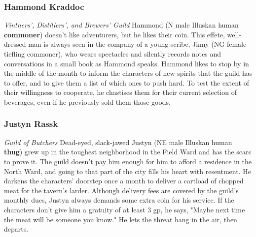 \documentclass[10pt,a4paper,twoside,twocolumn,openany,nodeprecatedcode]{dndbook}
\begin{document}
\subsubsection{Hammond Kraddoc}
\textit{Vintners', Distillers', and Brewers' Guild}
Hammond (N male Illuskan human \textbf{commoner}) doesn't like adventurers, but he likes their coin. This effete, well-dressed man is always seen in the company of a young scribe, Jinny (NG female tiefling commoner), who wears spectacles and silently records notes and conversations in a small book as Hammond speaks.
Hammond likes to stop by in the middle of the month to inform the characters of new spirits that the guild has to offer, and to give them a list of which ones to push hard. To test the extent of their willingness to cooperate, he chastises them for their current selection of beverages, even if he previously sold them those goods.
\subsubsection{Justyn Rassk}
\textit{Guild of Butchers}
Dead-eyed, slack-jawed Justyn (NE male Illuskan human \textbf{thug}) grew up in the toughest neighborhood in the Field Ward and has the scars to prove it. The guild doesn't pay him enough for him to afford a residence in the North Ward, and going to that part of the city fills his heart with resentment. He darkens the characters' doorstep once a month to deliver a cartload of chopped meat for the tavern's larder. Although delivery fees are covered by the guild's monthly dues, Justyn always demands some extra coin for his service. If the characters don't give him a gratuity of at least 3 gp, he says, "Maybe next time the meat will be someone you know." He lets the threat hang in the air, then departs.
\end{document}
